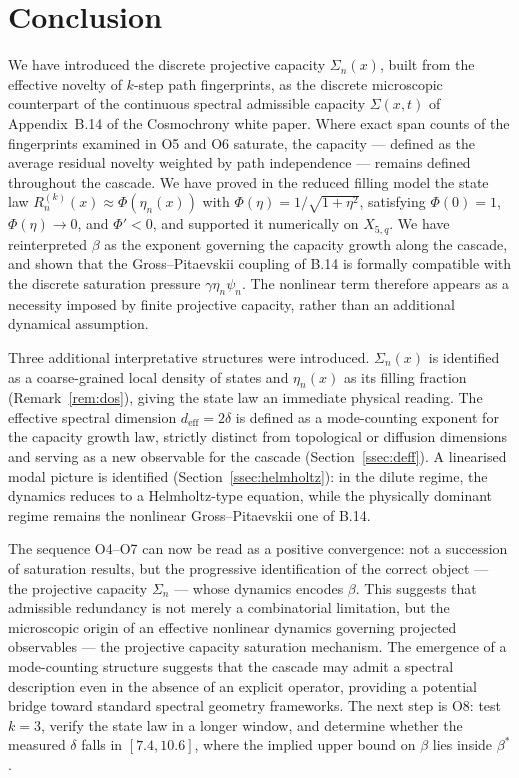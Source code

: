 \documentclass[11pt,a4paper]{article}
\theoremstyle{definition}
\theoremstyle{remark}
\begin{document}
  \section{Conclusion}
  \label{sec:conclusion}


  We have introduced the discrete projective capacity $\Sigma_n(x)$, built from the effective
  novelty of $k$-step path fingerprints, as the discrete microscopic counterpart of the
  continuous spectral admissible capacity $\Sigma(x,t)$ of Appendix~B.14 of the Cosmochrony
  white paper.
  Where exact span counts of the fingerprints examined in O5 and O6 saturate, the capacity
  --- defined as the average residual novelty weighted by path independence --- remains defined
  throughout the cascade.
  We have proved in the reduced filling model the state law $R_n^{(k)}(x) \approx \Phi(\eta_n(x))$
  with $\Phi(\eta) = 1/\sqrt{1+\eta^2}$, satisfying $\Phi(0)=1$, $\Phi(\eta)\to 0$,
  and $\Phi' < 0$, and supported it numerically on $X_{5,q}$.
  We have reinterpreted $\beta$ as the exponent governing the capacity growth along the cascade,
  and shown that the Gross--Pitaevskii coupling of B.14 is formally compatible with the discrete
  saturation pressure $\gamma\eta_n\psi_n$.
  The nonlinear term therefore appears as a necessity imposed by finite projective capacity,
  rather than an additional dynamical assumption.

  Three additional interpretative structures were introduced.
  $\Sigma_n(x)$ is identified as a coarse-grained local density of states and $\eta_n(x)$ as its
  filling fraction (Remark~\ref{rem:dos}), giving the state law an immediate physical reading.
  The effective spectral dimension $d_{\mathrm{eff}} = 2\delta$ is defined as a mode-counting
  exponent for the capacity growth law, strictly distinct from topological or diffusion
  dimensions and serving as a new observable for the cascade (Section~\ref{ssec:deff}).
  A linearised modal picture is identified (Section~\ref{ssec:helmholtz}): in the dilute regime,
  the dynamics reduces to a Helmholtz-type equation, while the physically dominant regime
  remains the nonlinear Gross--Pitaevskii one of B.14.

  The sequence O4--O7 can now be read as a positive convergence:
  not a succession of saturation results, but the progressive identification of the correct object
  --- the projective capacity $\Sigma_n$ --- whose dynamics encodes $\beta$.
  This suggests that admissible redundancy is not merely a combinatorial limitation, but the
  microscopic origin of an effective nonlinear dynamics governing projected observables ---
  the projective capacity saturation mechanism.
  The emergence of a mode-counting structure suggests that the cascade may admit a spectral
  description even in the absence of an explicit operator, providing a potential bridge toward
  standard spectral geometry frameworks.
  The next step is O8: test $k=3$, verify the state law in a longer window, and determine
  whether the measured $\delta$ falls in $[7.4, 10.6]$, where the implied upper bound on $\beta$ lies
  inside $\beta^*$.
\end{document}
